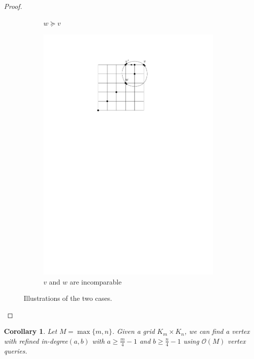 \documentclass[a4paper,10pt]{article}
\newtheorem{corollary}{Corollary}
\newcommand{\indegree}{refined in-degree\xspace}
\begin{document}
\begin{proof}
\begin{figure}[htbp]
\begin{subfigure}[b]{0.4\textwidth}
           \caption{$w \succeq v$}
       \end{subfigure}
       \qquad \qquad
       \begin{subfigure}[b]{0.4\textwidth}
           \includegraphics[scale = 0.7]{seedlemma_fig2_cas2.pdf}
           \caption{$v$ and $w$ are incomparable}
       \end{subfigure}
       \caption{Illustrations of the two cases. }
       \label{fig:seedlem2}
   \end{figure}
\end{proof}

\begin{corollary}\label{corollary: n/4 indegree}
 Let $M = \max\{m,n\}$. Given a grid $K_{m} \times K_{n}$, we can find a vertex with \indegree $(a,b)$ with $a \geq \frac{m}{4} - 1$ and  $b \geq \frac{n}{4} - 1$ using $\mathcal{O}(M)$ vertex queries.
\end{corollary}
\end{document}
